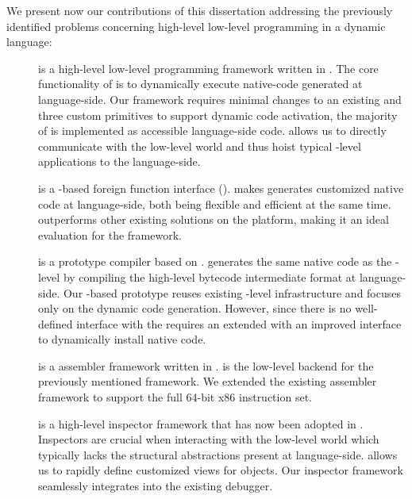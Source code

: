 We present now our contributions of this dissertation addressing the previously identified problems concerning high-level low-level programming in a dynamic language:

\begin{description}
	\item[\B] is a high-level low-level programming framework written in .
	The core functionality of \B is to dynamically execute native-code generated at language-side.
	Our framework requires minimal changes to an existing \VM and three custom primitives to support dynamic code activation, the majority of \B is implemented as accessible language-side code.
	\B allows us to directly communicate with the low-level world and thus hoist typical \VM-level applications to the language-side.
		
	\item[\NB] is a \B-based foreign function interface (\FFI).
	\NB makes generates customized native code at language-side, both being flexible and efficient at the same time.
	\NB outperforms other existing \FFI solutions on the \PH platform, making it an ideal evaluation for the \B framework.
	
	\item[\NBJ] is a prototype \JIT compiler based on \B.
	\NBJ generates the same native code as the \VM-level \JIT by compiling the high-level bytecode intermediate format at language-side.
	Our \B-based \JIT prototype reuses existing \VM-level infrastructure and focuses only on the dynamic code generation.
	However, since there is no well-defined interface with the \VM \NBJ requires an extended \VM with an improved \JIT interface to dynamically install native code.
	
	\item[\AsmJIT] is a assembler framework written in \PH.
	\AsmJIT is the low-level backend for the previously mentioned \B framework.
	We extended the existing assembler framework to support the full 64-bit x86 instruction set.
	
	\item[\Eye] is a high-level inspector framework that has now been adopted in \PH.
	Inspectors are crucial when interacting with the low-level world which typically lacks the structural abstractions present at language-side.
	\Eye allows us to rapidly define customized views for \PH objects.
	Our inspector framework seamlessly integrates into the existing \PH debugger.
		
\end{description}


